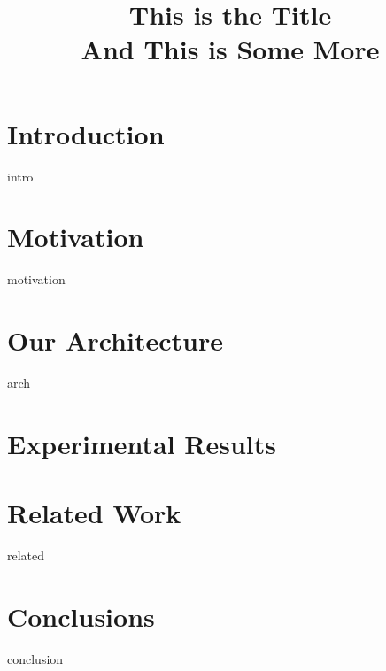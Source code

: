 \documentclass{sig-alternate}
\newcommand{\ignore}[1]{}
\begin{document}
\title{ This is the Title \\And This is Some More}


\date{}  %

\maketitle

\begin{abstract}
 
\end{abstract}

\section{Introduction}
\label{sec:intro}
 {intro}

\section{Motivation}
\label{sec:motivation}
 {motivation}

\ignore{Sometimes background is merged into motivation, and is not required separately.}

\section{Our Architecture}
\label{sec:arch}
 {arch}

\section{Experimental Results}
\label{sec:results}


\section{Related Work}
\label{sec:related}
 {related}

\section{Conclusions}
\label{sec:conclusion}
 {conclusion}


{ 


}
\end{document}
